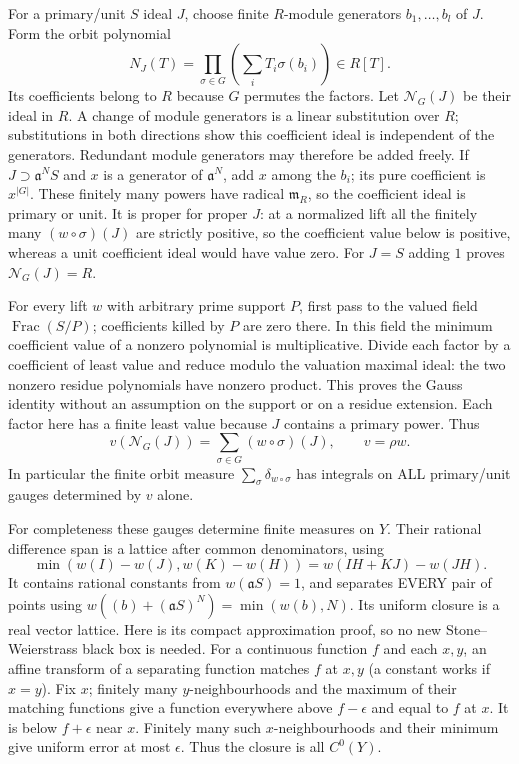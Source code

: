 \documentclass[11pt]{article}
\begin{document}
For a primary/unit $S$ ideal $J$, choose finite $R$-module generators
$b_1,\ldots,b_l$ of $J$. Form the orbit polynomial
\[
 N_J(T)=\prod_{\sigma\in G}\left(\sum_i T_i\sigma(b_i)\right)\in R[T].
\]
Its coefficients belong to $R$ because $G$ permutes the factors.
Let $\mathcal N_G(J)$ be their ideal in $R$. A change of module generators
is a linear substitution over $R$; substitutions in both directions show
this coefficient ideal is independent of the generators. Redundant
module generators may therefore be added freely. If $J\supset\mathfrak
 a^N S$ and $x$ is a generator of $\mathfrak a^N$, add $x$ among the
$b_i$; its pure coefficient is $x^{|G|}$. These finitely many powers have
radical $\mathfrak m_R$, so the coefficient ideal is primary or unit.
It is proper for proper $J$: at a normalized lift all the finitely many
$(w\circ\sigma)(J)$ are strictly positive, so the coefficient value below
is positive, whereas a unit coefficient ideal would have value zero.
For $J=S$ adding $1$ proves $\mathcal N_G(J)=R$.

For every lift $w$ with arbitrary prime support $P$, first pass to the
valued field $\operatorname{Frac}(S/P)$; coefficients killed by $P$ are
zero there. In this field the minimum coefficient value of a nonzero
polynomial is multiplicative. Divide each factor by a coefficient of
least value and reduce modulo the valuation maximal ideal: the two
nonzero residue polynomials have nonzero product. This proves the Gauss
identity without an assumption on the support or on a residue extension.
Each factor here has a finite least value because $J$ contains a primary
power. Thus
\[
 v(\mathcal N_G(J))=\sum_{\sigma\in G}(w\circ\sigma)(J),\qquad v=\rho w.
\]
In particular the finite orbit measure $\sum_\sigma\delta_{w\circ\sigma}$
has integrals on ALL primary/unit gauges determined by $v$ alone.

For completeness these gauges determine finite measures on $Y$.
Their rational difference span is a lattice after common denominators,
using
\[
 \min(w(I)-w(J),w(K)-w(H))=w(IH+KJ)-w(JH).
\]
It contains rational constants from $w(\mathfrak aS)=1$, and separates
EVERY pair of points using $w((b)+(\mathfrak aS)^N)=\min(w(b),N)$.
Its uniform closure is a real vector lattice. Here is its compact
approximation proof, so no new Stone--Weierstrass black box is needed.
For a continuous function $f$ and each $x,y$, an affine transform of a
separating function matches $f$ at $x,y$ (a constant works if $x=y$).
Fix $x$; finitely many $y$-neighbourhoods and the maximum of their matching
functions give a function everywhere above $f-\epsilon$ and equal to
$f$ at $x$. It is below $f+\epsilon$ near $x$. Finitely many such
$x$-neighbourhoods and their minimum give uniform error at most
$\epsilon$. Thus the closure is all $C^0(Y)$.
\end{document}
